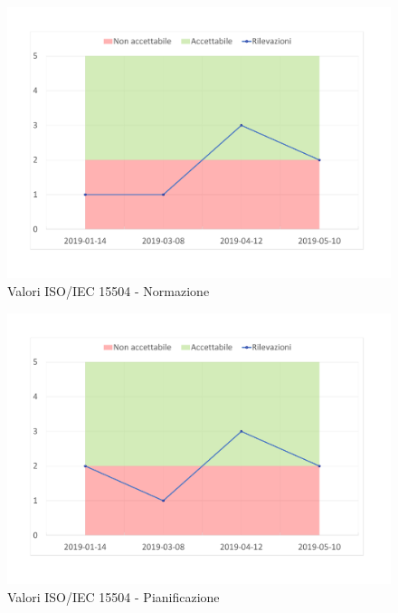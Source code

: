 \begin{figure}[H]
	\centering
	\includegraphics[scale=1]{images/resoconto/Normazione.pdf}
	\caption{Valori ISO/IEC 15504 - Normazione}	
\end{figure}


\begin{figure}[H]
	\centering
	\includegraphics[scale=1]{images/resoconto/Pianificazione.pdf}
	\caption{Valori ISO/IEC 15504 - Pianificazione}	
\end{figure}


